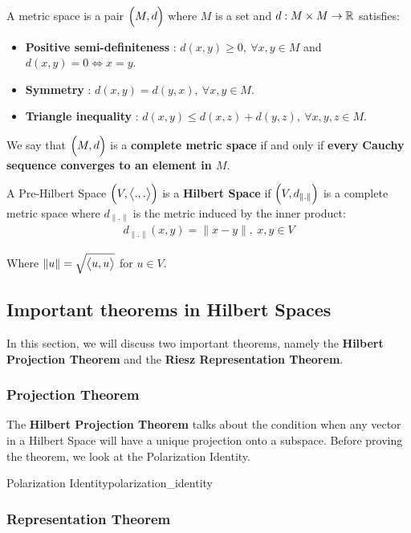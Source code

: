 \begin{definition}
    A metric space is a pair $\Big( M, d \Big)$ where $M$ is a set and $d:M\times M\to \mathbb{R}$ satisfies:
    \begin{itemize}
        \item \textbf{Positive semi-definiteness} : $d(x, y) \ge 0, \ \forall x, y \in M$ and $d(x, y) = 0 \iff x = y$.
        \item \textbf{Symmetry} : $d(x, y) = d(y, x), \ \forall x, y \in M$.
        \item \textbf{Triangle inequality} : $d(x, y) \le d(x, z) + d(y, z), \ \forall x, y, z \in M$.
    \end{itemize}

    \noindent We say that $\Big( M, d \Big)$ is a \textbf{complete metric space} if and only if \textbf{every Cauchy sequence converges to an element in $M$}.
\end{definition}

\begin{definition}
    A Pre-Hilbert Space $\Big( V, \big<.,.\big> \Big)$ is a \textbf{Hilbert Space} if $\Big( V, d_{\|.\|} \Big)$ is a complete metric space where $d_{\|.\|}$ is the metric induced by the inner product:
    \begin{align*}
        d_{\|.\|}(x, y) = \|x - y\|, \ x, y \in V
    \end{align*}

    \noindent Where $\|u\| = \sqrt{\big<u, u\big>}$ for $u\in V$.
\end{definition}

\subsection{Important theorems in Hilbert Spaces}
In this section, we will discuss two important theorems, namely the \textbf{Hilbert Projection Theorem} and the \textbf{Riesz Representation Theorem}.

\subsubsection{Projection Theorem}
The \textbf{Hilbert Projection Theorem} talks about the condition when any vector in a Hilbert Space will have a unique projection onto a subspace. Before proving the theorem, we look at the Polarization Identity.

\begin{lemma}{Polarization Identity}{polarization_identity}
    
\end{lemma}


\subsubsection{Representation Theorem}
